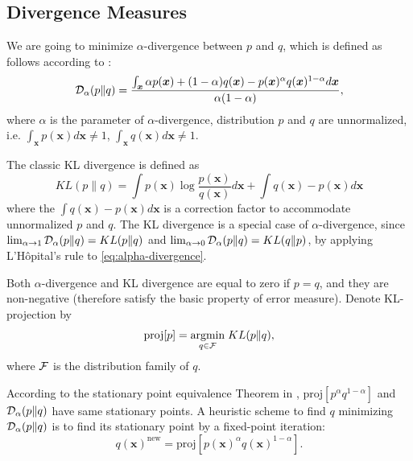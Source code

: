 \documentclass{article}
\begin{document}
\subsection{Divergence Measures}
We are going to minimize $\alpha$-divergence between $p$ and $q$, which is defined as follows according to \cite{Zhu95informationgeometric}\cite{divergence-measures-and-message-passing}: \\
\begin{equation}\label{eq:alpha-divergence}
  \mathcal{D}_{\alpha}(p \| q ) = \frac{\int_{\bm{x}} \alpha p(\bm{x}) + (1-\alpha) q (\bm{x}) - p(\bm{x})^{\alpha} q(\bm{x})^{1-\alpha} d\bm{x}}{\alpha(1-\alpha)},
\end{equation}
where $\alpha$ is the parameter of $\alpha$-divergence, distribution $p$ and $q$ are unnormalized, i.e. $\int_{\bm{x}}p(\bm{x}) d\bm{x} \neq 1$, $\int_{\bm{x}}q(\bm{x}) d\bm{x} \neq 1$.

The classic KL divergence is defined as
\begin{equation}
  KL(p \| q) = \int p(\bm{x}) \log{\frac{p(\bm{x})}{q(\bm{x})}} d \bm{x}+ \int q(\bm{x}) - p(\bm{x}) d\bm{x}
\end{equation}
where the $\int q(\bm{x}) - p(\bm{x}) d\bm{x}$ is a correction factor to accommodate unnormalized $p$ and $q$. The KL divergence is a special case of $\alpha$-divergence, since $\lim_{\alpha \rightarrow 1}\mathcal{D}_{\alpha}(p \| q ) = KL(p\|q)$ and $\lim_{\alpha \rightarrow 0}\mathcal{D}_{\alpha}(p \| q ) = KL(q\|p)$, by applying L'H\^opital's rule to \autoref{eq:alpha-divergence}.

Both $\alpha$-divergence and KL divergence are equal to zero if $p=q$, and they are non-negative (therefore satisfy the basic property of error measure).
Denote KL-projection by
\begin{equation}
  \text{proj}[p] = \underset{q \in \mathcal{F}}{\operatorname{argmin}}\; KL(p\|q),
\end{equation}
where $\mathcal{F}$ is the distribution family of $q$.

According to the stationary point equivalence Theorem in \cite{divergence-measures-and-message-passing}, $\text{proj}[p^{\alpha}q^{1- \alpha}]$ and $\mathcal{D}_{\alpha}(p\|q)$ have same stationary points. A heuristic scheme to find $q$ minimizing $\mathcal{D}_{\alpha}(p\|q)$ is to find its stationary point by a fixed-point iteration:
\begin{equation}\label{eq:fixed-point-iter}
  q(\bm{x})^{\text{new}}  = \text{proj}[p(\bm{x})^{\alpha}q(\bm{x})^{1-\alpha}].
\end{equation}
\end{document}
